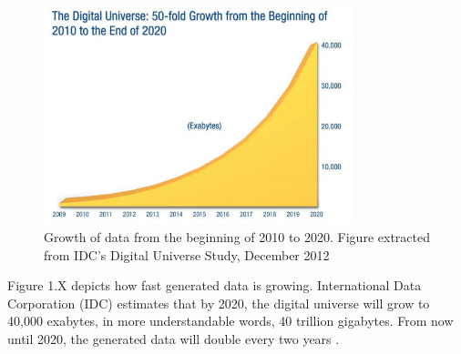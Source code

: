 \begin{figure}[htb]
\centering
\includegraphics[width=0.8\textwidth]{./images/bigData.png}
\caption{Growth of data from the beginning of 2010 to 2020. Figure extracted from IDC's Digital Universe Study, December 2012} \label{fig:bigData}
\end{figure}

Figure 1.X depicts how fast generated data is growing. International Data Corporation (IDC) estimates that by 2020, the digital universe will grow to 40,000 exabytes, in more understandable words, 40 trillion gigabytes. From now until 2020, the generated data will double every two years \cite{gantz2012digital}.

